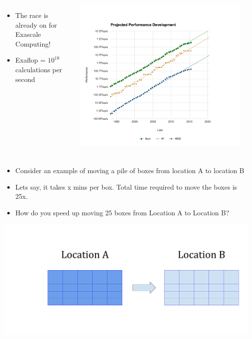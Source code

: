 \documentclass[10pt,t]{beamer}
\begin{document}
\begin{frame}[allowframebreaks,c]
\begin{itemize}
\begin{columns}[c]
\begin{itemize}
      \item The race is already on for Exascale Computing!
      \item[] Exaflop = $10^{18}$ calculations per second
      \end{itemize}
      \includegraphics[width=0.95\textwidth]{./top500}
    \end{columns}
  \end{itemize}
\end{frame}

\begin{frame}
  \frametitle{  }
  \begin{itemize}
  \item Consider an example of moving a pile of boxes from location A to location B
  \item Lets say, it takes x mins per box. Total time required to move the boxes is 25x.
  \item How do you speed up moving 25 boxes from Location A to Location B?
  \end{itemize}
  \includegraphics[width=\textwidth,clip=true]{./Serial}
\end{frame}
\end{document}
